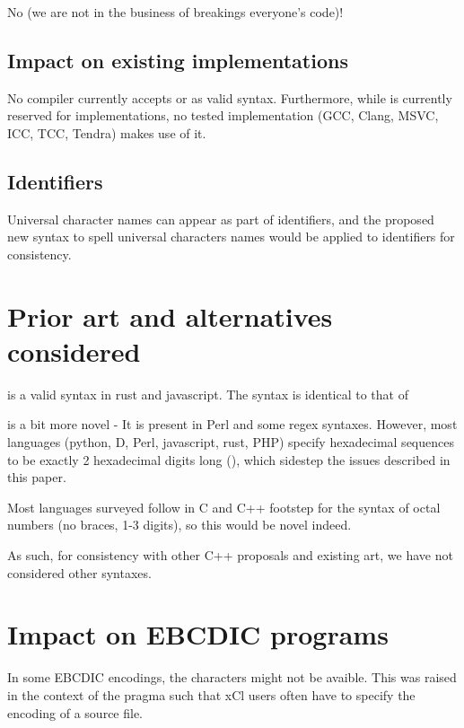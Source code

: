 \documentclass{wg21}
\begin{document}
No (we are not in the business of breakings everyone's code)!

\subsection{Impact on existing implementations}

No compiler currently accepts  or  as valid syntax.
Furthermore, while  is currently reserved for implementations, no tested implementation (GCC, Clang, MSVC, ICC, TCC, Tendra) makes use of it.

\subsection{Identifiers}

Universal character names can appear as part of identifiers, 
and the proposed new syntax to spell universal characters names would be applied to identifiers for consistency.

\section{Prior art and alternatives considered}

 is a valid syntax in rust and javascript.
The syntax is identical to that of 

 is a bit more novel - It is present in Perl and some regex syntaxes.
However, most languages (python, D, Perl, javascript, rust, PHP) specify hexadecimal sequences to be exactly 2 hexadecimal digits long (), which sidestep the issues described in this paper.

Most languages surveyed follow in C and C++ footstep for the syntax of octal numbers (no braces, 1-3 digits), so this would be novel indeed.

As such, for consistency with other C++ proposals and existing art, we have not considered other syntaxes.

\section{Impact on EBCDIC programs}

In some EBCDIC encodings, the \tcode{\{\ \}} characters might not be avaible.
This was raised in the context of the  pragma such that xCl users often have to specify the encoding of a source file.
\end{document}

